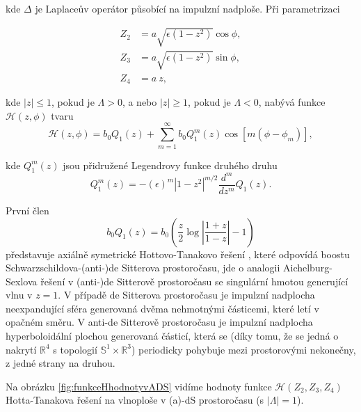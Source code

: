kde $\Delta$ je Laplaceův operátor působící na impulzní nadploše. Při parametrizaci 

\begin{equation}
    \begin{split}
        Z_2 &= a \sqrt{\epsilon(1-z^2)} \cos \phi,\\
        Z_3 &= a \sqrt{\epsilon(1-z^2)} \sin \phi,\\
        Z_4 &= a~z,
    \end{split}
\end{equation}

kde $\left|z\right| \leq 1$, pokud je $\Lambda > 0$, a nebo $\left|z\right| \geq 1$, pokud je $\Lambda < 0$,
nabývá funkce $\mathcal{H}(z, \phi)$ tvaru
\begin{equation}
    \mathcal{H}(z, \phi) = b_0 Q_1(z) + \sum_{m=1}^\infty b_0 Q_1^m(z) \cos [m(\phi - \phi_m)],
\end{equation}

kde $Q_1^m(z)$ jsou přidružené Legendrovy funkce druhého druhu
\begin{equation}
    Q_1^m(z) = -(\epsilon)^m |1-z^2|^{m/2} \frac{d^m}{dz^m}Q_1(z).
\end{equation}

První člen
\begin{equation}
    b_0 Q_1(z) = b_0 \left(\frac{z}{2} \log \left|\frac{1+z}{1-z}\right| - 1\right)
\end{equation}
představuje axiálně symetrické Hottovo-Tanakovo řešení \cite{Hotta_1993}, které odpovídá boostu Schwarzschildova-(anti-)de Sitterova
prostoročasu, jde o analogii Aichelburg-Sexlova řešení v (anti-)de Sitterově prostoročasu se singulární hmotou generující vlnu v $z=1$. V případě de Sitterova prostoročasu je impulzní nadplocha
neexpandující sféra generovaná dvěma nehmotnými částicemi, které letí v opačném směru. V anti-de Sitterově prostoročasu je impulzní nadplocha hyperboloidální
plochou generovaná částicí, která se (díky tomu, že se jedná o nakrytí $\mathbb{R}^4$ s topologií $\mathbb{S}^1 \times \mathbb{R}^3$) periodicky pohybuje mezi prostorovými nekonečny,
z jedné strany na druhou.

Na obrázku \ref{fig:funkceHhodnotyvADS} vidíme hodnoty funkce $\mathcal{H}(Z_2, Z_3, Z_4)$ Hotta-Tanakova řešení na vlnoploše v (a)-dS prostoročasu (s $|\Lambda | = 1$).

